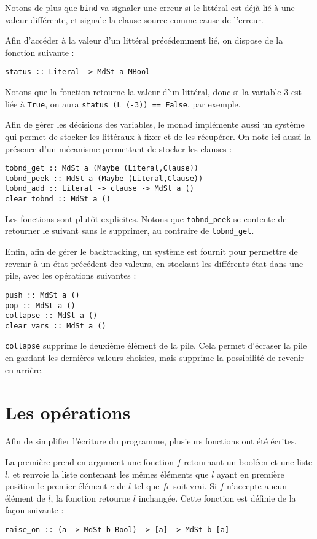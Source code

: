 Notons de plus que \texttt{bind} va signaler une erreur si le littéral est
déjà lié à une valeur différente, et signale la clause source comme cause de
l'erreur.

Afin d'accéder à la valeur d'un littéral précédemment lié, on dispose de la
fonction suivante :
\begin{lstlisting}
status :: Literal -> MdSt a MBool
\end{lstlisting}

Notons que la fonction retourne la valeur d'un littéral, donc si la variable
$3$ est liée à \texttt{True}, on aura \texttt{status (L (-3)) == False}, par
exemple.

Afin de gérer les décisions des variables, le monad implémente aussi un système
qui permet de stocker les littéraux à fixer et de les récupérer. On note ici
aussi la présence d'un mécanisme permettant de stocker les clauses :
\begin{lstlisting}
tobnd_get :: MdSt a (Maybe (Literal,Clause))
tobnd_peek :: MdSt a (Maybe (Literal,Clause))
tobnd_add :: Literal -> clause -> MdSt a ()
clear_tobnd :: MdSt a ()
\end{lstlisting}

Les fonctions sont plutôt explicites. Notons que \texttt{tobnd\_peek} se
contente de retourner le suivant sans le supprimer, au contraire de
\texttt{tobnd\_get}.

Enfin, afin de gérer le backtracking, un système est fournit pour permettre de
revenir à un état précédent des valeurs, en stockant les différents état dans 
une pile, avec les opérations suivantes :
\begin{lstlisting}
push :: MdSt a ()
pop :: MdSt a ()
collapse :: MdSt a ()
clear_vars :: MdSt a ()
\end{lstlisting}

\texttt{collapse} supprime le deuxième élément de la pile. Cela permet
d'écraser la pile en gardant les dernières valeurs choisies, mais supprime la
possibilité de revenir en arrière.

\section{Les opérations}
Afin de simplifier l'écriture du programme, plusieurs fonctions ont été
écrites.

La première prend en argument une fonction $f$ retournant un booléen et une
liste $l$, et renvoie la liste contenant les mêmes éléments que $l$ ayant en
première position le premier élément $e$ de $l$ tel que $f e$ soit vrai. Si $f$
n'accepte aucun élément de $l$, la fonction retourne $l$ inchangée. Cette
fonction est définie de la façon suivante :
\begin{lstlisting}
raise_on :: (a -> MdSt b Bool) -> [a] -> MdSt b [a]
\end{lstlisting}

